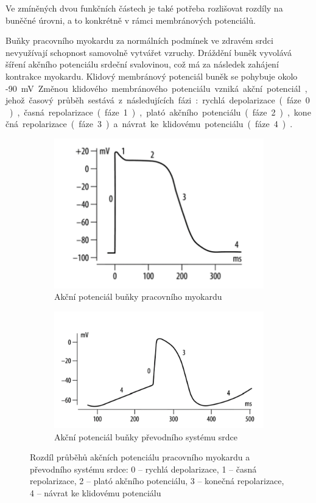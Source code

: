 Ve zmíněných dvou funkčních částech je také potřeba rozlišovat rozdíly na
buněčné úrovni, a to konkrétně v rámci membránových potenciálů. 

Buňky pracovního myokardu za normálních podmínek ve zdravém srdci nevyužívají
schopnost samovolně vytvářet vzruchy. Dráždění buněk vyvolává šíření akčního
potenciálu srdeční svalovinou, což má za následek zahájení kontrakce myokardu.
Klidový membránový potenciál buněk se pohybuje okolo -90~\si\mV. Změnou klidového
membránového potenciálu vzniká akční potenciál, jehož časový průběh sestává z
následujících fázi: rychlá depolarizace (fáze 0), časná repolarizace (fáze 1),
plató akčního potenciálu (fáze 2), konečná repolarizace (fáze 3) a návrat ke
klidovému potenciálu (fáze 4)~\cite{Petrek2019}.
\begin{figure}[h]
	\centering
	\begin{subfigure}{0.4\textwidth}
		\includegraphics[width=1\textwidth]{../assets/anatomy/myokard_ap}
		\caption{Akční potenciál buňky pracovního myokardu~\cite{Petrek2019}}
		\label{fig:myokard_ap}
	\end{subfigure}
	\hfil
	\begin{subfigure}{0.5\textwidth}
		\includegraphics[width=1\textwidth]{../assets/anatomy/pss_ap}
		\caption{Akční potenciál buňky převodního systému
		srdce~\cite{Petrek2019}}
		\label{fig:pss_ap}
	\end{subfigure}
	\caption{Rozdíl průběhů akčních potenciálu pracovního myokardu a převodního
		systému srdce: 0 -- rychlá depolarizace, 1 -- časná repolarizace, 2 --
		plató akčního potenciálu, 3 -- konečná repolarizace, 4 -- návrat ke
		klidovému potenciálu}
	\label{fig:ap}
\end{figure}
